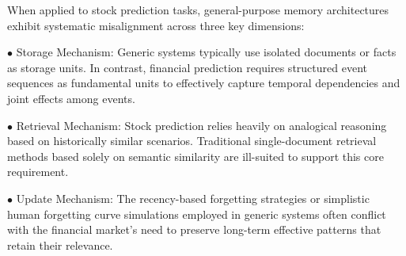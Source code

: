 \documentclass[sigconf, nonacm]{acmart} %
\begin{document}

When applied to stock prediction tasks, general-purpose memory architectures exhibit systematic misalignment across three key dimensions:

$\bullet$ Storage Mechanism: Generic systems typically use isolated documents or facts as storage units. In contrast, financial prediction requires structured event sequences as fundamental units to effectively capture temporal dependencies and joint effects among events\cite{shi2025hybrid}.

$\bullet$ Retrieval Mechanism: Stock prediction relies heavily on analogical reasoning based on historically similar scenarios. Traditional single-document retrieval methods based solely on semantic similarity are ill-suited to support this core requirement.

$\bullet$ Update Mechanism: The recency-based forgetting strategies or simplistic human forgetting curve simulations employed in generic systems often conflict with the financial market's need to preserve long-term effective patterns that retain their relevance.
\end{document}
